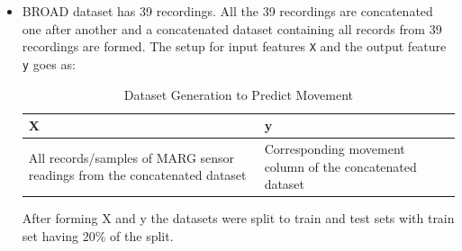\documentclass{iutbscthesis}
\begin{document}
\begin{itemize}
    \item BROAD dataset has 39 recordings. All the 39 recordings are concatenated one after another and a concatenated dataset containing all records from 39 recordings are formed. The setup for input features \verb|X| and the output feature \verb|y| goes as: \\
    \begin{table}[htbp]
    \centering
    \caption{Dataset Generation to Predict Movement}    \label{tab:sensor_readings}
        \begin{adjustbox}{max width=0.8\textwidth}
            \begin{tabular}{| p{} | p{} |}
            \hline
            \textbf{X} & \textbf{y} \\
            \hline
            All records/samples of MARG sensor readings from the concatenated dataset & Corresponding movement column of the concatenated dataset \\
            \hline
            \end{tabular}
        \end{adjustbox}
    \end{table}
    After forming X and y the datasets were split to train and test sets with train set having 20\% of the split.


\end{itemize}
\end{document}
